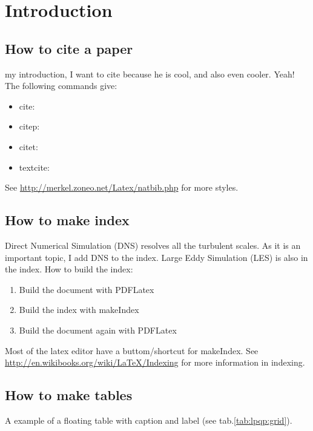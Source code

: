 \chapter{Introduction}
\label{sec: Introduction}

\section{How to cite a paper}
\label{sec: How to cite a paper}

my introduction, I want to cite \citep{Moeng2007} because he is cool, and also \textcite{Pope2000} even cooler. Yeah! The following commands  give:
\begin{itemize}
\item cite: \cite{Moeng2007}
\item citep: \citep{Moeng2007}	
\item citet: \citet{Moeng2007}	
\item textcite: \textcite{Moeng2007}	
\end{itemize}
See \url{http://merkel.zoneo.net/Latex/natbib.php} for more styles.

\section{How to make index}
\label{sec:How to make index}
Direct Numerical Simulation  (DNS) resolves all the turbulent scales. As it is an important topic, I add DNS to the index. Large Eddy Simulation  (LES) is also in the index. How to build the index:
\begin{enumerate}
	\item Build the document with PDFLatex
	\item Build the index with makeIndex
	\item Build the document again with PDFLatex
\end{enumerate}
Most of the latex editor have a buttom/shortcut for makeIndex. See \url{http://en.wikibooks.org/wiki/LaTeX/Indexing} for more information in indexing.

\section{How to make tables}
\label{sec:How to make tables}
A example of a floating table with caption and label (see tab.\ref{tab:lpqp:grid}).

